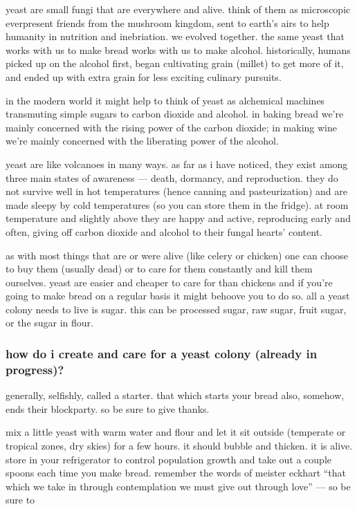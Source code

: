yeast are small fungi that are everywhere and alive. think of them as
microscopic everpresent friends from the mushroom kingdom, sent to
earth's airs to help humanity in nutrition and inebriation. we
evolved together. the same yeast that works with us to make bread
works with us to make alcohol. historically, humans picked up on the
alcohol first, began cultivating grain (millet) to get more of it, and
ended up with extra grain for less exciting culinary pursuits.

in the modern world it might help to think of yeast as alchemical
machines transmuting simple sugars to carbon dioxide and alcohol. in
baking bread we're mainly concerned with the rising power of the
carbon dioxide; in making wine we're mainly concerned with the
liberating power of the alcohol.

yeast are like volcanoes in many ways. as far as i have noticed, they
exist among three main states of awareness --- death, dormancy, and
reproduction. they do not survive well in hot temperatures (hence
canning and pasteurization) and are made sleepy by cold temperatures
(so you can store them in the fridge). at room temperature and
slightly above they are happy and active, reproducing early and often,
giving off carbon dioxide and alcohol to their fungal hearts'
content.

as with most things that are or were alive (like celery or chicken)
one can choose to buy them (usually dead) or to care for them
constantly and kill them ourselves. yeast are easier and cheaper to
care for than chickens and if you're going to make bread on a
regular basis it might behoove you to do so. all a yeast colony needs
to live is sugar. this can be processed sugar, raw sugar, fruit sugar,
or the sugar in flour.

\subsubsection{how do i create and care for a yeast colony (already in progress)?}

generally, selfishly, called a starter. that which starts your bread
also, somehow, ends their blockparty. so be sure to give thanks.

mix a little yeast with warm water and flour and let it sit outside
(temperate or tropical zones, dry skies) for a few hours. it should
bubble and thicken. it is alive. store in your refrigerator to control
population growth and take out a couple spoons each time you make
bread. remember the words of meister eckhart ``that which we take in
through contemplation we must give out through love'' --- so be
sure to

